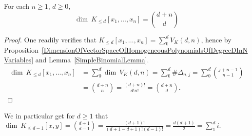 \begin{proposition}\label{DimensionOfVectorSpaceOfPolynomialsInNVariablesOfAtMostDegreeD}
    For each $n\geq 1$, $d\geq 0$, 
    $$\dim\ K_{\leq d}[x_1,\dots,x_n] = {d+n\choose d}$$
\end{proposition}
\begin{proof}
    One readily verifies that $K_{\leq d}[x_1,\dots,x_n] = \sum_0^d V_K(d,n)$, hence by Proposition~\ref{DimensionOfVectorSpaceOfHomogeneousPolynomialsOfDegreeDInNVariables} and Lemma~\ref{SimpleBinomialLemma}.
    \begin{align*}
        \dim\ K_{\leq d}[x_1,\dots,x_n] &= \sum_0^d \dim\ V_K(d,n)=\sum_0^d \#\Delta_{n,j} = \sum_0^d {j+n-1 \choose n-1}\\
        &={d+n\choose n} = \frac{(d+n)!}{d!n!}={d+n\choose d}.
    \end{align*}
\end{proof}
\begin{example}\label{ImportantExamplePolynomialVectorSpaceDimension}
    We in particular get for $d\geq 1$ that $\dim\ K_{\leq d-1}[x,y] = {d+1\choose d-1} = \frac{(d+1)!}{(d+1-d+1)!(d-1)!}=\frac{d(d+1)}{2}=\sum_1^di.$
\end{example}

